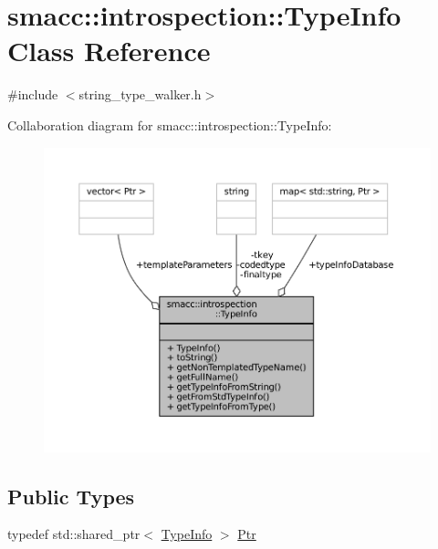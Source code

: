 \hypertarget{classsmacc_1_1introspection_1_1TypeInfo}{}\section{smacc\+:\+:introspection\+:\+:Type\+Info Class Reference}
\label{classsmacc_1_1introspection_1_1TypeInfo}


{\ttfamily \#include $<$string\+\_\+type\+\_\+walker.\+h$>$}



Collaboration diagram for smacc\+:\+:introspection\+:\+:Type\+Info\+:
\nopagebreak
\begin{figure}[H]
\begin{center}
\leavevmode
\includegraphics[width=350pt]{classsmacc_1_1introspection_1_1TypeInfo__coll__graph}
\end{center}
\end{figure}
\subsection*{Public Types}
\begin{DoxyCompactItemize}
\item 
typedef std\+::shared\+\_\+ptr$<$ \hyperlink{classsmacc_1_1introspection_1_1TypeInfo}{Type\+Info} $>$ \hyperlink{classsmacc_1_1introspection_1_1TypeInfo_aa6ffd9c39811d59f7c771941b7fad860}{Ptr}
\end{DoxyCompactItemize}
